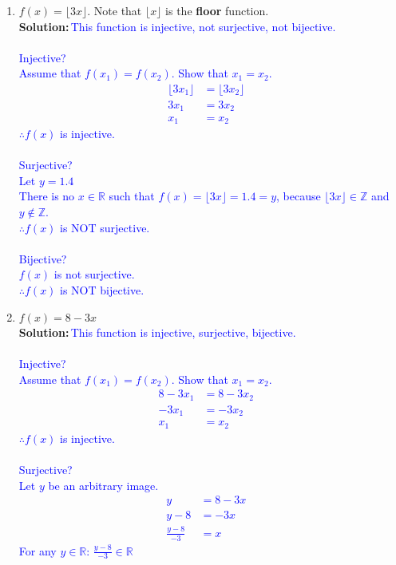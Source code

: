 \documentclass{article}
\newcommand{\sol}[1]{\textbf{Solution:\,}\textcolor{blue}{#1}}
\begin{document}
\begin{enumerate}
\begin{enumerate}	
\item $f(x) = \lfloor 3 x \rfloor$. Note that $\lfloor x \rfloor$ is the \textbf{floor} function.
\\\sol{This function is injective, not surjective, not bijective.
\\\\Injective?
\\Assume that $f(x_1)=f(x_2)$. Show that $x_1=x_2$.
\begin{align*}
\lfloor 3 x_1 \rfloor&=\lfloor 3 x_2 \rfloor&\text{}\\
3 x_1&=3 x_2&\text{}\\
x_1&=x_2&\text{}
\end{align*}
$\therefore f(x)$ is injective.
\\\\Surjective?
\\Let $y=1.4$
\\There is no $x\in\mathbb{R}$ such that $f(x)=\lfloor 3 x \rfloor=1.4=y$, because $\lfloor 3 x \rfloor\in\mathbb{Z}$ and $y\not\in\mathbb{Z}$.
\\$\therefore f(x)$ is NOT surjective.
\\\\Bijective?
\\$f(x)$ is not surjective.
\\$\therefore f(x)$ is NOT bijective.
}\\
\item $f(x) = 8-3x$
\\\sol{This function is injective, surjective, bijective.
\\\\Injective?
\\Assume that $f(x_1)=f(x_2)$. Show that $x_1=x_2$.
\begin{align*}
8-3x_1&=8-3x_2&\text{}\\
-3x_1&=-3x_2&\text{}\\
x_1&=x_2&\text{}
\end{align*}
$\therefore f(x)$ is injective.
\\\\Surjective?
\\Let $y$ be an arbitrary image.
\begin{align*}
y&=8-3x&\text{}\\
y-8&=-3x&\text{}\\
\frac{y-8}{-3}&=x&\text{}
\end{align*}
For any $y\in\mathbb{R}$: $\frac{y-8}{-3}\in\mathbb{R}$
}
\end{enumerate}
\end{enumerate}
\end{document}
